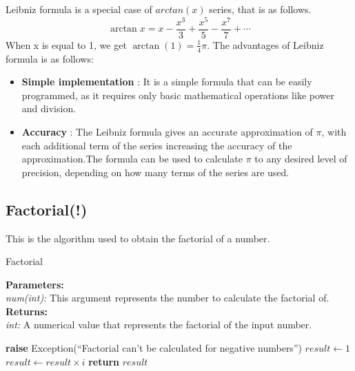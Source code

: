   \begin{flushleft}
    Leibniz formula is a special case of $arctan(x)$ series, that is as follows.
    $$\arctan x=x-{\frac {x^{3}}{3}}+{\frac {x^{5}}{5}}-{\frac {x^{7}}{7}}+\cdots$$
    When x is equal to 1, we get $\arctan(1) = {\frac{1}{4}}\pi.$
    The advantages of Leibniz formula is as follows:
    \begin{itemize}
      \item \textbf{Simple implementation} : It is a simple formula that can be easily programmed, as it requires only basic mathematical operations like power and division.
      \item \textbf{Accuracy} : The Leibniz formula gives an accurate approximation of $\pi$, with each additional term of the series increasing the accuracy of the approximation.The formula can be used to calculate $\pi$ to any desired level of precision, depending on how many terms of the series are used.
    \end{itemize}
  \end{flushleft}
\pagebreak

\subsection{Factorial(!)}
  \begin{flushleft}
    This is the algorithm used to obtain the factorial of a number.
  \end{flushleft}
  \begin{algorithm}
    \caption{Factorial}\label{factorial}
    \begin{tabbing}
      \textbf{Parameters:}\\
        \hspace{1em}\textit{num(int):} This argument represents the number to calculate the factorial of.\\
      
      \textbf{Returns:}\\
        \hspace{1em}\textit{int:} A numerical value that represents the factorial of the input number. \\
    \end{tabbing}
  \begin{algorithmic}[1]
        \State \textbf{raise} Exception(``Factorial can't be calculated for negative numbers'')
      \EndIf
      \State $result \gets 1$
        \State $result \gets result \times i$
      \EndFor
      \State \textbf{return} $result$
    \EndFunction
    \end{algorithmic}
  \end{algorithm}

